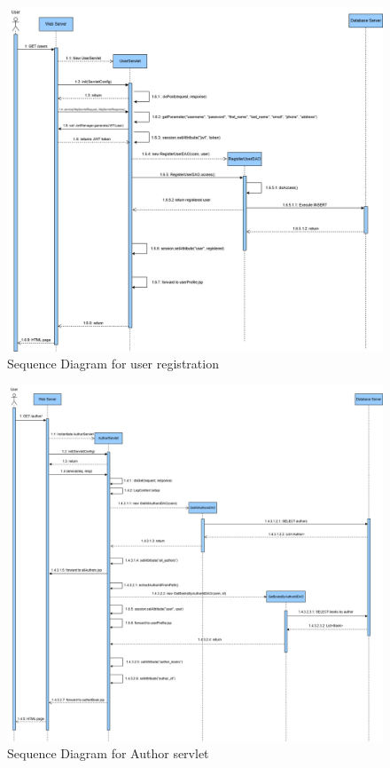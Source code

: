 \clearpage
\begin{figure}[h!]
    \centering
    \includegraphics[width=\textwidth]{photos/registeruser-sequence-diagram.png}
    \caption{Sequence Diagram for user registration}
    \label{fig:registerusersequencediagram}
\end{figure}

\clearpage
\begin{figure}[h!]
    \centering
    \includegraphics[width=\textwidth]{photos/Sequence_Diagram_for_AuthorServlet.png}
    \caption{Sequence Diagram for Author servlet}
    \label{fig:authorservletsequencediagram}
\end{figure}